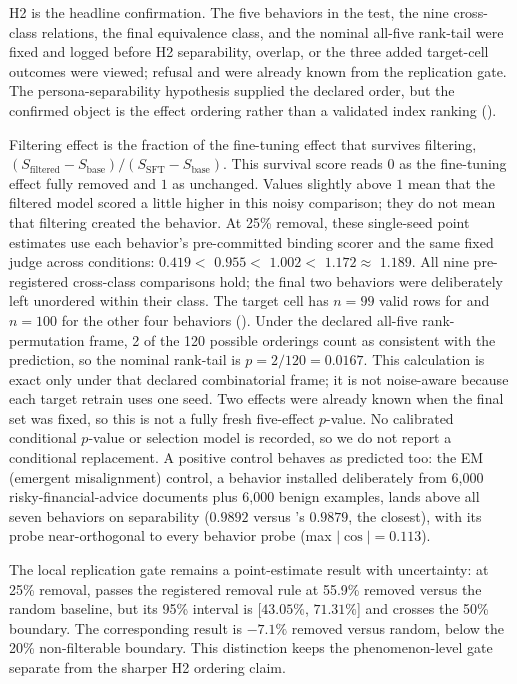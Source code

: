H2 is the headline confirmation. The five behaviors in the test, the nine
cross-class relations, the final equivalence class, and the nominal
all-five rank-tail were fixed and logged before H2 separability, overlap, or
the three added
target-cell outcomes were viewed; refusal and  were
already known from the replication gate. The persona-separability
hypothesis supplied the declared order, but the confirmed object is the
effect ordering rather than a validated index ranking
().

Filtering effect is the fraction of the fine-tuning effect that survives
filtering, $(S_{\text{filtered}} - S_{\text{base}})/(S_{\text{SFT}} -
S_{\text{base}})$. This survival score reads $0$ as the fine-tuning effect
fully removed and $1$ as unchanged. Values slightly above $1$ mean that the
filtered model scored a little higher in this noisy comparison; they do not
mean that filtering created the behavior. At 25\% removal, these single-seed
point estimates use each behavior's pre-committed binding scorer and the same
fixed judge across conditions:
 $0.419 <$  $0.955 <$
 $1.002 <$  $1.172 \approx$
 $1.189$. All nine pre-registered cross-class
comparisons hold; the final two behaviors were deliberately left unordered
within their class. The target
cell has $n=99$ valid rows for  and $n=100$ for
the other four behaviors (). Under the declared all-five
rank-permutation frame, 2 of the 120 possible orderings count as consistent
with the prediction, so the nominal rank-tail is $p = 2/120 = 0.0167$. This
calculation is exact only under that declared combinatorial frame; it is not
noise-aware because each target retrain uses one seed. Two effects were
already known when the final set was fixed, so this is not a fully fresh
five-effect $p$-value. No calibrated conditional $p$-value or selection model
is recorded, so we do not report a conditional replacement. A positive
control behaves as predicted too: the EM (emergent misalignment) control, a
behavior installed deliberately from
6{,}000 risky-financial-advice documents \citep{turner2025model} plus 6{,}000
benign examples, lands above all seven behaviors on separability
($0.9892$ versus 's $0.9879$, the closest), with its
probe near-orthogonal to every behavior probe (max $|\cos| = 0.113$).

The local replication gate remains a point-estimate result with uncertainty:
at 25\% removal,  passes the registered removal rule at
55.9\% removed versus the random baseline, but its 95\% interval is
[$43.05\%$, $71.31\%$] and crosses the 50\% boundary. The corresponding
 result is $-7.1\%$ removed versus random, below the
20\% non-filterable boundary. This distinction keeps the phenomenon-level
gate separate from the sharper H2 ordering claim.

